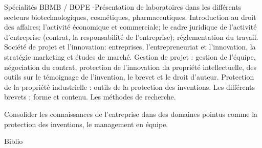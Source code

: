 \documentclass[10pt, a5paper]{report}
\begin{document}
\vfill
\module[codeApogee={SOM3IP00},
titre={Filières professionnelles}, 
COURS={12}, 
TD={}, 
TP={}, 
CTD={},
CTP={}, 
TOTAL={12}, 
SEMESTRE={Semestre 3}, 
COEFF={2}, 
ECTS={2}, 
nomPremierResp={William Même}, 
emailPremierResp={william.meme@univ-orleans.fr}, 
nomSecondResp={Aline Lejeune}, 
emailSecondResp={aline.lejeune@univ-orleans.fr}, 
langue={Français},
nbPrerequis={0}, 
descriptionCourte={true}, 
descriptionLongue={true}, 
objectifs={true}, 
ressources={false}, 
bibliographie={false}] 
{
Spécialités BBMB / BOPE
} 
{
-Présentation de laboratoires dans les différents secteurs biotechnologiques, cosmétiques, pharmaceutiques. Introduction au droit des affaires; l'activité économique et commerciale; le cadre juridique de l'activité d'entreprise (contrat, la responsabilité de l'entreprise); réglementation du travail. Société de projet et l'innovation: entreprises, l'entrepreneuriat et l'innovation, la stratégie marketing et études de marché. Gestion de projet : gestion de l'équipe, négociation du contrat, protection de l'innovation :la propriété intellectuelle, des outils sur le témoignage de l'invention, le brevet et le droit d'auteur. Protection de la propriété industrielle : outils de la protection des inventions. Les différents brevets ; forme et contenu. Les méthodes de recherche.
}
{
} 
{\begin{itemize} 
  \ObjItem Consolider les connaissances de l’entreprise dans des domaines pointus comme la protection des inventions, le management en équipe.
\end{itemize} 
} 
{} 
{Biblio}
 
\end{document}
